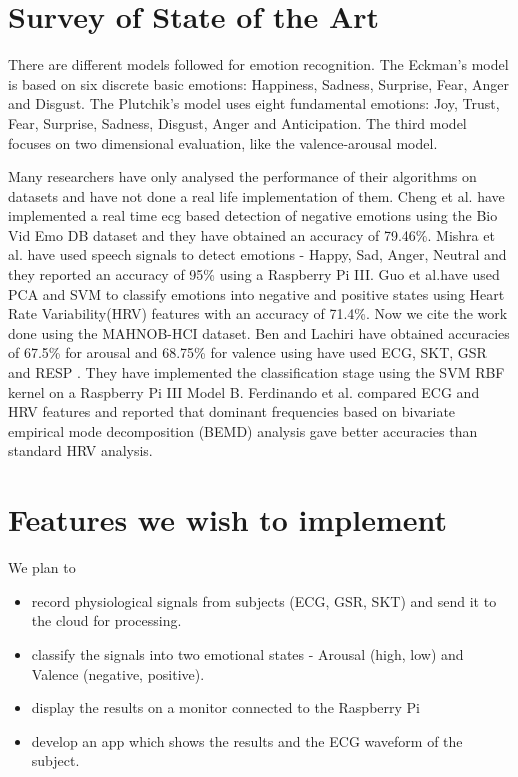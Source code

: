 \documentclass[11pt]{article}
\theoremstyle{definition}
\begin{document}
  \section{Survey of State of the Art}
    There are different models followed for emotion recognition.
    The Eckman's model is based on six discrete basic emotions: Happiness, Sadness, Surprise, Fear, Anger and Disgust\cite{ekman_universals_1987}.
    The Plutchik's model uses eight fundamental emotions: Joy, Trust, Fear, Surprise, Sadness, Disgust, Anger and Anticipation\cite{plutchik_nature_2001}.
    The third model\cite{russell_evidence_1977} focuses on two dimensional evaluation, like the valence-arousal model\cite{soleymani_multimodal_2012}.

    Many researchers have only analysed the performance of their algorithms on datasets and have not done a real life implementation of them.
    Cheng et al.\cite{cheng_novel_2017} have implemented a real time ecg based detection of negative emotions using the Bio Vid Emo DB dataset and they have obtained an accuracy of 79.46\%.
    Mishra et al.\cite{mishra_real_2017} have used speech signals to detect emotions - Happy, Sad, Anger, Neutral and they reported an accuracy of 95\% using a Raspberry Pi III.
    Guo et al.\cite{guo_heart_2016}have used PCA and SVM to classify emotions into negative and positive states using Heart Rate Variability(HRV) features with an accuracy of 71.4\%.
    Now we cite the work done using the MAHNOB-HCI dataset\cite{soleymani_multimodal_2012}.
    Ben and Lachiri\cite{ben_emotion_2017} have obtained accuracies of 67.5\% for arousal and 68.75\% for valence using have used ECG, SKT, GSR and RESP . They have implemented the classification stage using the SVM RBF kernel on a Raspberry Pi III Model B.
    Ferdinando et al.\cite{ferdinando_comparing_2016} compared ECG and HRV features and reported that dominant frequencies based on
    bivariate empirical mode decomposition (BEMD) analysis gave better accuracies than standard HRV analysis.

  \newpage
  \section{Features we wish to implement}
    We plan to
    \begin{itemize}
      \item record physiological signals from subjects (ECG, GSR, SKT) and send it to the cloud for processing.
      \item classify the signals into two emotional states - Arousal (high, low) and Valence (negative, positive)\cite{ben_emotion_2017}.
      \item display the results on a monitor connected to the Raspberry Pi
      \item develop an app which shows the results and the ECG waveform of the subject.
    \end{itemize}
\end{document}
